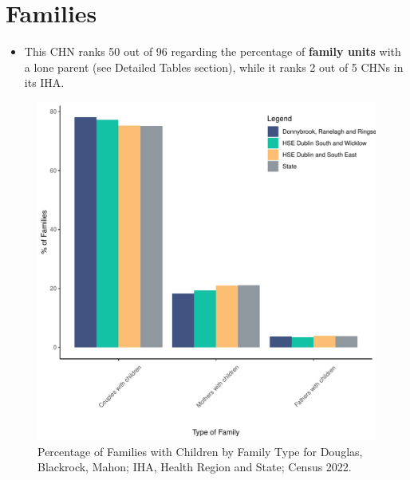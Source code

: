 \documentclass{article}
\begin{document}
\section{Families}\label{sect:Fam}
\begin{itemize}
\item This CHN ranks  50 out of 96 regarding the percentage of \textbf{family units} with a lone parent (see Detailed Tables section), while it ranks   2 out of 5 CHNs in its IHA.
\end{itemize}
\begin{figure}[H]
	\centering
	\includegraphics[width = 150mm]{../figures/FamED.pdf}
	\caption{Percentage of Families with Children by Family Type for Douglas, Blackrock, Mahon; IHA, Health Region and State; Census 2022.}
	\label{fig:vbnv}
	\end{figure}
	
\end{document}
